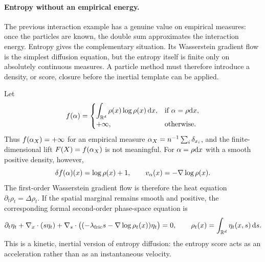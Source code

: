 \paragraph{Entropy without an empirical energy.}
The previous interaction example has a genuine value on empirical measures: once the particles are known, the double sum approximates the interaction energy. Entropy gives the complementary situation. Its Wasserstein gradient flow is the simplest diffusion equation, but the entropy itself is finite only on absolutely continuous measures. A particle method must therefore introduce a density, or score, closure before the inertial template can be applied.

\begin{example}\label{ex-second-order-entropy-score}
	Let
	\[
		f(\alpha)=
		\begin{cases}
			\displaystyle \int_{\mathbb{R}^d} \rho(x)\log\rho(x)\,\mathrm{d} x,
			& \text{if } \alpha=\rho\mathrm{d} x,\\[.4em]
			+\infty, & \text{otherwise.}
		\end{cases}
	\]
	Thus $f(\alpha_X)=+\infty$ for an empirical measure $\alpha_X=n^{-1}\sum_i\delta_{x_i}$, and the finite-dimensional lift $F(X)=f(\alpha_X)$ is not meaningful. For $\alpha=\rho\mathrm{d} x$ with a smooth positive density, however,
	\[
		\delta f(\alpha)(x)=\log\rho(x)+1,
			\qquad
		v_\alpha(x)=-\nabla\log\rho(x).
	\]
	The first-order Wasserstein gradient flow is therefore the heat equation $\partial_t\rho_t=\Delta\rho_t$. If the spatial marginal remains smooth and positive, the corresponding formal second-order phase-space equation is
	\begin{equation}\label{eq-second-order-entropy-phase-space}
		\partial_t\eta_t
		+
		\nabla_x\cdot(s\eta_t)
		+
		\nabla_s\cdot\bigl((-\lambda_{\rm fric} s-\nabla\log\rho_t(x))\eta_t\bigr)
		=0,
		\qquad
		\rho_t(x)=\int_{\mathbb{R}^d}\eta_t(x,s)\,\mathrm{d} s.
	\end{equation}
	This is a kinetic, inertial version of entropy diffusion: the entropy score acts as an acceleration rather than as an instantaneous velocity.
	\end{example}

